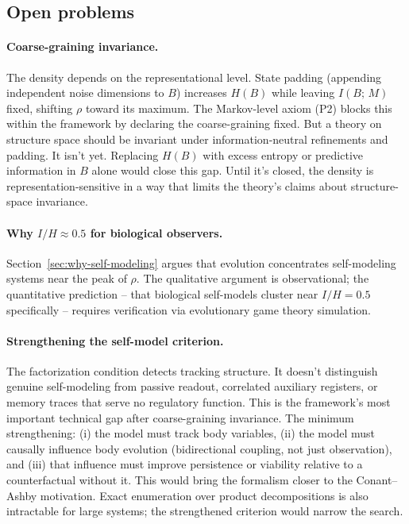 \documentclass[12pt]{article}
\theoremstyle{remark}
\begin{document}
\subsection{Open problems}\label{sec:open}

\paragraph{Coarse-graining invariance.} The density depends on the representational level. State padding (appending independent noise dimensions to $B$) increases $H(B)$ while leaving $I(B;\,M)$ fixed, shifting $\rho$ toward its maximum. The Markov-level axiom (P2) blocks this within the framework by declaring the coarse-graining fixed. But a theory on structure space should be invariant under information-neutral refinements and padding. It isn't yet. Replacing $H(B)$ with excess entropy or predictive information in $B$ alone would close this gap. Until it's closed, the density is representation-sensitive in a way that limits the theory's claims about structure-space invariance.

\paragraph{Why $I/H \approx 0.5$ for biological observers.} Section~\ref{sec:why-self-modeling} argues that evolution concentrates self-modeling systems near the peak of $\rho$. The qualitative argument is observational; the quantitative prediction -- that biological self-models cluster near $I/H = 0.5$ specifically -- requires verification via evolutionary game theory simulation.

\paragraph{Strengthening the self-model criterion.} The factorization condition detects tracking structure. It doesn't distinguish genuine self-modeling from passive readout, correlated auxiliary registers, or memory traces that serve no regulatory function. This is the framework's most important technical gap after coarse-graining invariance. The minimum strengthening: (i) the model must track body variables, (ii) the model must causally influence body evolution (bidirectional coupling, not just observation), and (iii) that influence must improve persistence or viability relative to a counterfactual without it. This would bring the formalism closer to the Conant--Ashby motivation. Exact enumeration over product decompositions is also intractable for large systems; the strengthened criterion would narrow the search.
\end{document}
